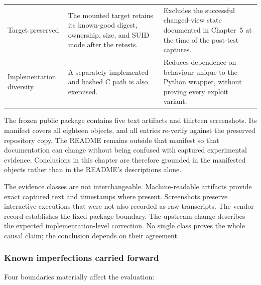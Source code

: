 \begin{table}[H]
\begin{tabularx}{\textwidth}{@{}>{\bfseries\raggedright\arraybackslash}p{}>{\raggedright\arraybackslash}p{}Y@{}}
        Target preserved &
        The mounted target retains its known-good digest, ownership, size, and
        SUID mode after the retests. &
        Excludes the successful changed-view state documented in Chapter~5 at
        the time of the post-test captures. \\

        Implementation diversity &
        A separately implemented and hashed C path is also exercised. &
        Reduces dependence on behaviour unique to the Python wrapper, without
        proving every exploit variant. \\
        \bottomrule
    \end{tabularx}
\end{table}

The frozen public package contains five text artifacts and thirteen
screenshots. Its  manifest covers all eighteen
objects, and all entries re-verify against the preserved repository copy. The
README remains outside that manifest so that documentation can change without
being confused with captured experimental evidence. Conclusions in this
chapter are therefore grounded in the manifested objects rather than in the
README's descriptions alone.

The evidence classes are not interchangeable. Machine-readable artifacts
provide exact captured text and timestamps where present. Screenshots preserve
interactive executions that were not also recorded as raw transcripts. The
vendor record establishes the fixed package boundary. The upstream change
describes the expected implementation-level correction. No single class proves
the whole causal claim; the conclusion depends on their agreement.

\subsubsection{Known imperfections carried forward}

Four boundaries materially affect the evaluation:


